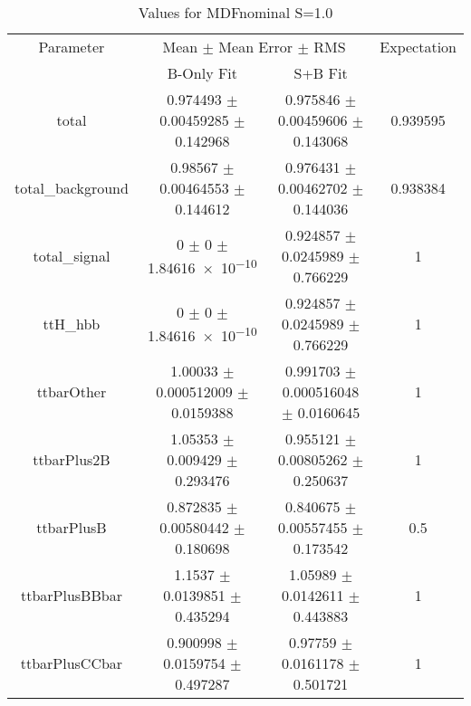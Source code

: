 \begin{table}
\centering
\caption{Values for MDFnominal S=1.0}
\begin{tabular}{cccc}
\toprule
Parameter & \multicolumn{2}{c}{Mean $\pm$ Mean Error $\pm$ RMS} & Expectation\\
 & B-Only Fit & S+B Fit & \\
\midrule
total & \num{0.974493} $\pm$ \num{0.00459285} $\pm$ \num{0.142968} & \num{0.975846} $\pm$ \num{0.00459606} $\pm$ \num{0.143068} & \num{0.939595}\\
total\_background & \num{0.98567} $\pm$ \num{0.00464553} $\pm$ \num{0.144612} & \num{0.976431} $\pm$ \num{0.00462702} $\pm$ \num{0.144036} & \num{0.938384}\\
total\_signal & \num{0} $\pm$ \num{0} $\pm$ \num{1.84616e-10} & \num{0.924857} $\pm$ \num{0.0245989} $\pm$ \num{0.766229} & \num{1}\\
ttH\_hbb & \num{0} $\pm$ \num{0} $\pm$ \num{1.84616e-10} & \num{0.924857} $\pm$ \num{0.0245989} $\pm$ \num{0.766229} & \num{1}\\
ttbarOther & \num{1.00033} $\pm$ \num{0.000512009} $\pm$ \num{0.0159388} & \num{0.991703} $\pm$ \num{0.000516048} $\pm$ \num{0.0160645} & \num{1}\\
ttbarPlus2B & \num{1.05353} $\pm$ \num{0.009429} $\pm$ \num{0.293476} & \num{0.955121} $\pm$ \num{0.00805262} $\pm$ \num{0.250637} & \num{1}\\
ttbarPlusB & \num{0.872835} $\pm$ \num{0.00580442} $\pm$ \num{0.180698} & \num{0.840675} $\pm$ \num{0.00557455} $\pm$ \num{0.173542} & \num{0.5}\\
ttbarPlusBBbar & \num{1.1537} $\pm$ \num{0.0139851} $\pm$ \num{0.435294} & \num{1.05989} $\pm$ \num{0.0142611} $\pm$ \num{0.443883} & \num{1}\\
ttbarPlusCCbar & \num{0.900998} $\pm$ \num{0.0159754} $\pm$ \num{0.497287} & \num{0.97759} $\pm$ \num{0.0161178} $\pm$ \num{0.501721} & \num{1}\\
\bottomrule
\end{tabular}
\end{table}